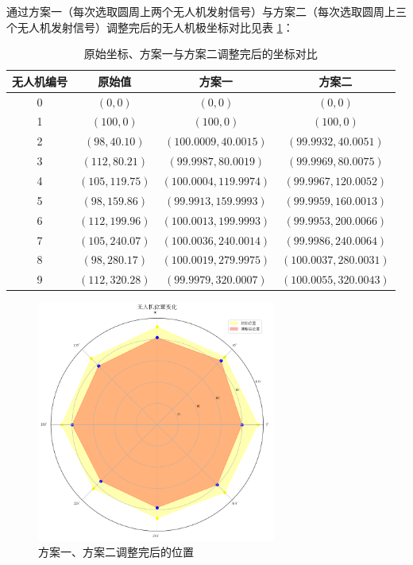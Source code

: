 \documentclass[withoutpreface,bwprint]{cumcmthesis} %
\begin{document}
通过方案一（每次选取圆周上两个无人机发射信号）与方案二（每次选取圆周上三个无人机发射信号）调整完后的无人机极坐标对比见表 \ref{tab:original_compare}：

\begin{table}[htbp]
  \centering
  \caption{原始坐标、方案一与方案二调整完后的坐标对比}
  \label{tab:original_compare}
  \begin{tabular}{cccc}
    \toprule
    无人机编号 & 原始值 & 方案一 & 方案二 \\
    \midrule
    0 & $(0, 0)$ & $(0, 0)$ & $(0, 0)$ \\
    1 & $(100, 0)$ & $(100, 0)$ & $(100, 0)$ \\
    2 & $(98, 40.10)$ & $(100.0009, 40.0015)$ & $(99.9932, 40.0051)$ \\
    3 & $(112, 80.21)$ & $(99.9987, 80.0019)$ & $(99.9969, 80.0075)$ \\
    4 & $(105, 119.75)$ & $(100.0004, 119.9974)$ & $(99.9967, 120.0052)$ \\
    5 & $(98, 159.86)$ & $(99.9913, 159.9993)$ & $(99.9959, 160.0013)$ \\
    6 & $(112, 199.96)$ & $(100.0013, 199.9993)$ & $(99.9953, 200.0066)$ \\
    7 & $(105, 240.07)$ & $(100.0036, 240.0014)$ & $(99.9986, 240.0064)$ \\
    8 & $(98, 280.17)$ & $(100.0019, 279.9975)$ & $(100.0037, 280.0031)$ \\
    9 & $(112, 320.28)$ & $(99.9979, 320.0007)$ & $(100.0055, 320.0043)$ \\
    \bottomrule
  \end{tabular}
\end{table}

\begin{figure}[htbp]
  \centering
  \includegraphics[width=0.7\textwidth]{../../figure/q3_3.png} %
  \caption{方案一、方案二调整完后的位置}
  \label{q3_3}
\end{figure}
\end{document}
